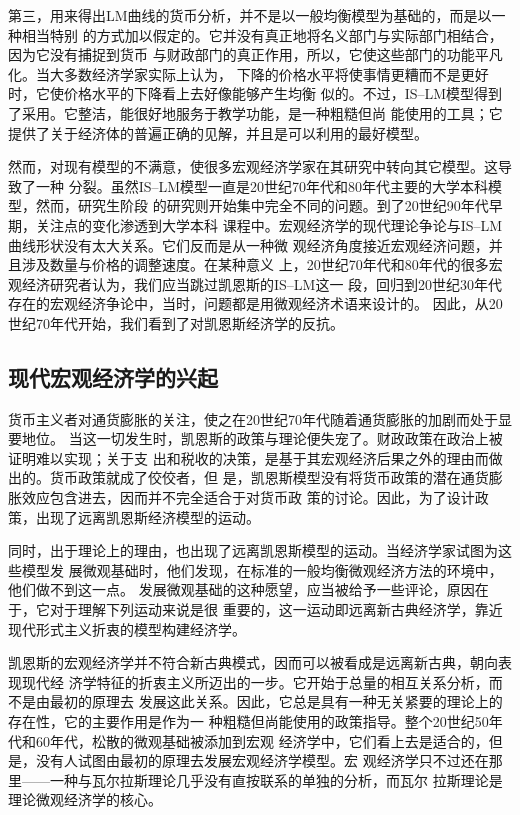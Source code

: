 第三，用来得出LM曲线的货币分析，并不是以一般均衡模型为基础的，而是以一种相当特别
的方式加以假定的。它并没有真正地将名义部门与实际部门相结合，因为它没有捕捉到货币
与财政部门的真正作用，所以，它使这些部门的功能平凡化。当大多数经济学家实际上认为，
下降的价格水平将使事情更糟而不是更好时，它使价格水平的下降看上去好像能够产生均衡
似的。不过，IS--LM模型得到了采用。它整洁，能很好地服务于教学功能，是一种粗糙但尚
能使用的工具；它提供了关于经济体的普遍正确的见解，并且是可以利用的最好模型。

然而，对现有模型的不满意，使很多宏观经济学家在其研究中转向其它模型。这导致了一种
分裂。虽然IS--LM模型一直是20世纪70年代和80年代主要的大学本科模型，然而，研究生阶段
的研究则开始集中完全不同的问题。到了20世纪90年代早期，关注点的变化渗透到大学本科
课程中。宏观经济学的现代理论争论与IS--LM曲线形状没有太大关系。它们反而是从一种微
观经济角度接近宏观经济问题，并且涉及数量与价格的调整速度。在某种意义
上，20世纪70年代和80年代的很多宏观经济研究者认为，我们应当跳过凯恩斯的IS--LM这一
段，回归到20世纪30年代存在的宏观经济争论中，当时，问题都是用微观经济术语来设计的。
因此，从20世纪70年代开始，我们看到了对凯恩斯经济学的反抗。
\clearpage
\subsection{现代宏观经济学的兴起}

货币主义者对通货膨胀的关注，使之在20世纪70年代随着通货膨胀的加剧而处于显要地位。
当这一切发生时，凯恩斯的政策与理论便失宠了。财政政策在政治上被证明难以实现；关于支
出和税收的决策，是基于其宏观经济后果之外的理由而做出的。货币政策就成了佼佼者，但
是，凯恩斯模型没有将货币政策的潜在通货膨胀效应包含进去，因而并不完全适合于对货币政
策的讨论。因此，为了设计政策，出现了远离凯恩斯经济模型的运动。

同时，出于理论上的理由，也出现了远离凯恩斯模型的运动。当经济学家试图为这些模型发
展微观基础时，他们发现，在标准的一般均衡微观经济方法的环境中，他们做不到这一点。
发展微观基础的这种愿望，应当被给予一些评论，原因在于，它对于理解下列运动来说是很
重要的，这一运动即远离新古典经济学，靠近现代形式主义折衷的模型构建经济学。

凯恩斯的宏观经济学并不符合新古典模式，因而可以被看成是远离新古典，朝向表现现代经
济学特征的折衷主义所迈出的一步。它开始于总量的相互关系分析，而不是由最初的原理去
发展这此关系。因此，它总是具有一种无关紧要的理论上的存在性，它的主要作用是作为一
种粗糙但尚能使用的政策指导。整个20世纪50年代和60年代，松散的微观基础被添加到宏观
经济学中，它们看上去是适合的，但是，没有人试图由最初的原理去发展宏观经济学模型。宏
观经济学只不过还在那里——一种与瓦尔拉斯理论几乎没有直按联系的单独的分析，而瓦尔
拉斯理论是理论微观经济学的核心。

